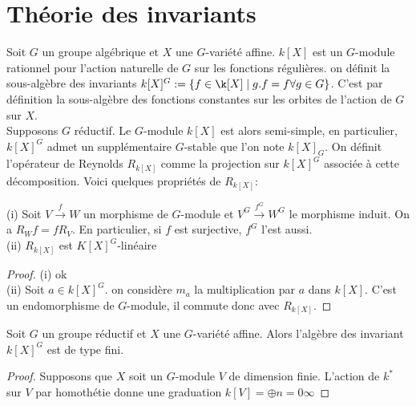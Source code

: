\section{Théorie des invariants}
Soit $G$ un groupe algébrique et $X$ une $G$-variété affine. $k[X]$ est un $G$-module rationnel pour l'action naturelle de $G$ sur les fonctions régulières. on définit la sous-algèbre des invariants $k[X]^G:=\lbrace f\in\k[X]\mid g.f=f \forall g\in G\rbrace$. C'est par définition la sous-algèbre des fonctions constantes sur les orbites de l'action de $G$ sur $X$.\\
Supposons $G$ réductif. Le $G$-module $k[X]$ est alors semi-simple, en particulier, $k[X]^G$ admet un supplémentaire $G$-stable que l'on note $k[X]_G$. On définit l'opérateur de Reynolds $R_{k[X]}$ comme la projection sur $k[X]^G$ associée à cette décomposition. Voici quelques propriétés de $R_{k[X]}$:


\begin{prop}
(i) Soit $V \xrightarrow{f}W$ un morphisme de $G$-module et $V^G \xrightarrow{f^G}W^G$ le morphisme induit. On a $R_Wf=fR_V$. En particulier, si $f$ est surjective, $f^G$ l'est aussi.\\
(ii) $R_{k[X]}$ est $K[X]^G$-linéaire\\

\end{prop}
\begin{proof}
(i) ok\\
(ii) Soit $a\in k[X]^G$. on considère $m_a$ la multiplication par $a$ dans $k[X]$. C'est un endomorphisme de $G$-module, il commute donc avec $R_{k[X]}$. 
\end{proof}

\begin{thm}[Hilbert]
Soit $G$ un groupe réductif et $X$ une $G$-variété affine. Alors l'algèbre des invariant $k[X]^G$ est de type fini.
\end{thm}
\begin{proof}
Supposons que $X$ soit un $G$-module $V$ de dimension finie. L'action de $k^*$ sur $V$ par homothétie donne une graduation $k[V]=\oplus{n=0}{\infty}$ 
\end{proof}

